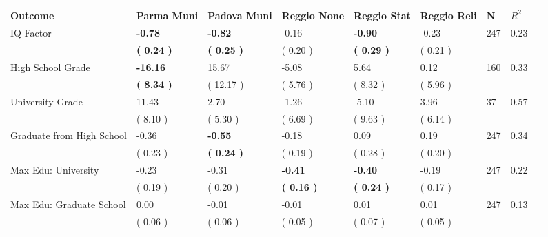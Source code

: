 \begin{tabular}{L{6.2cm} C{1.8cm} C{1.8cm} C{1.8cm} C{1.8cm} C{1.8cm} C{1.8cm} C{0.3cm} C{0.3cm}}
\toprule
 \textbf{Outcome} & \textbf{Parma Muni} & \textbf{Padova Muni} & \textbf{Reggio None} & \textbf{Reggio Stat} & \textbf{Reggio Reli} & \textbf{N} & \textbf{$ R^2$} \\
\midrule
IQ Factor & \textbf{    -0.78} & \textbf{    -0.82} &     -0.16 & \textbf{    -0.90} &     -0.23  & 247 &       0.23 \\ 
 & \textbf{(     0.24 )} & \textbf{(     0.25 )} & (     0.20 ) & \textbf{(     0.29 )} & (     0.21 )  & \\
High School Grade & \textbf{   -16.16} &     15.67 &     -5.08 &      5.64 &      0.12  & 160 &       0.33 \\ 
 & \textbf{(     8.34 )} & (    12.17 ) & (     5.76 ) & (     8.32 ) & (     5.96 )  & \\
University Grade &     11.43 &      2.70 &     -1.26 &     -5.10 &      3.96  & 37 &       0.57 \\ 
 & (     8.10 ) & (     5.30 ) & (     6.69 ) & (     9.63 ) & (     6.14 )  & \\
Graduate from High School &     -0.36 & \textbf{    -0.55} &     -0.18 &      0.09 &      0.19  & 247 &       0.34 \\ 
 & (     0.23 ) & \textbf{(     0.24 )} & (     0.19 ) & (     0.28 ) & (     0.20 )  & \\
Max Edu: University &     -0.23 &     -0.31 & \textbf{    -0.41} & \textbf{    -0.40} &     -0.19  & 247 &       0.22 \\ 
 & (     0.19 ) & (     0.20 ) & \textbf{(     0.16 )} & \textbf{(     0.24 )} & (     0.17 )  & \\
Max Edu: Graduate School &      0.00 &     -0.01 &     -0.01 &      0.01 &      0.01  & 247 &       0.13 \\ 
 & (     0.06 ) & (     0.06 ) & (     0.05 ) & (     0.07 ) & (     0.05 )  & \\
\bottomrule
\end{tabular}
